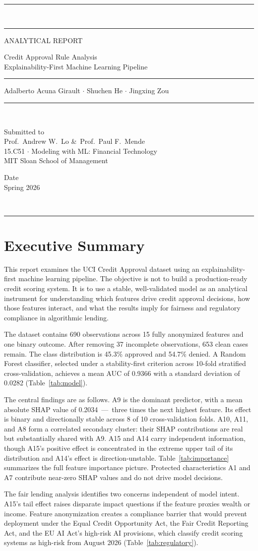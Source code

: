 \documentclass[11pt]{article}
\newcommand{\coverpage}{%
  \thispagestyle{empty}
  {\color{NavyReport}\rule{\linewidth}{6pt}}\\[2pt]
  {\color{AccentBlue}\rule{\linewidth}{1.5pt}}
  \vspace{2.4cm}

  {\fontfamily{phv}\fontseries{b}\fontsize{9}{11}\selectfont
   \color{AccentBlue}\MakeUppercase{Analytical Report}}

  \vspace{0.5cm}

  {\fontfamily{phv}\fontseries{b}\fontsize{26}{30}\selectfont
   \color{NavyReport} Credit Approval Rule Analysis}\\[0.5em]
  {\fontfamily{phv}\fontseries{m}\fontsize{14}{17}\selectfont
   \color{AccentBlue} Explainability-First Machine Learning Pipeline}

  \vspace{0.6cm}
  {\color{MidGray}\rule{\linewidth}{0.6pt}}
  \vspace{0.4cm}

  {\fontfamily{phv}\fontsize{10}{12}\selectfont
   \color{NavyReport}
   Adalberto Acuna Girault $\cdot$ Shuchen He $\cdot$ Jingxing Zou}

  \vfill

  {\color{MidGray}\rule{\linewidth}{0.6pt}}\\[8pt]
  \begin{minipage}[t]{0.55\linewidth}
    {\fontfamily{phv}\fontseries{b}\fontsize{9}{11}\selectfont\color{NavyReport}
     Submitted to}\\[3pt]
    {\fontfamily{phv}\fontsize{9}{12}\selectfont\color{NavyReport}
     Prof.\ Andrew W.\ Lo \&\ Prof.\ Paul F.\ Mende\\[1pt]
     15.C51 $\cdot$ Modeling with ML: Financial Technology\\[1pt]
     MIT Sloan School of Management}
  \end{minipage}%
  \hfill
  \begin{minipage}[t]{0.35\linewidth}
    \raggedleft
    {\fontfamily{phv}\fontseries{b}\fontsize{9}{11}\selectfont\color{NavyReport}
     Date}\\[3pt]
    {\fontfamily{phv}\fontsize{9}{12}\selectfont\color{NavyReport} Spring 2026}
  \end{minipage}
  \\[6pt]
  {\color{NavyReport}\rule{\linewidth}{3pt}}
  \newpage
}
\begin{document}
\coverpage

{\hypersetup{linkcolor=NavyReport}
\tableofcontents}
\newpage

\section{Executive Summary}

This report examines the UCI Credit Approval dataset using an explainability-first machine learning pipeline. The objective is not to build a production-ready credit scoring system. It is to use a stable, well-validated model as an analytical instrument for understanding which features drive credit approval decisions, how those features interact, and what the results imply for fairness and regulatory compliance in algorithmic lending.

The dataset contains 690 observations across 15 fully anonymized features and one binary outcome. After removing 37 incomplete observations, 653 clean cases remain. The class distribution is 45.3\% approved and 54.7\% denied. A Random Forest classifier, selected under a stability-first criterion across 10-fold stratified cross-validation, achieves a mean AUC of 0.9366 with a standard deviation of 0.0282 (Table~\ref{tab:model}).

The central findings are as follows. A9 is the dominant predictor, with a mean absolute SHAP value of 0.2034~---~three times the next highest feature. Its effect is binary and directionally stable across 8 of 10 cross-validation folds. A10, A11, and A8 form a correlated secondary cluster: their SHAP contributions are real but substantially shared with A9. A15 and A14 carry independent information, though A15's positive effect is concentrated in the extreme upper tail of its distribution and A14's effect is direction-unstable. Table~\ref{tab:importance} summarizes the full feature importance picture. Protected characteristics A1 and A7 contribute near-zero SHAP values and do not drive model decisions.

The fair lending analysis identifies two concerns independent of model intent. A15's tail effect raises disparate impact questions if the feature proxies wealth or income. Feature anonymization creates a compliance barrier that would prevent deployment under the Equal Credit Opportunity Act, the Fair Credit Reporting Act, and the EU AI Act's high-risk AI provisions, which classify credit scoring systems as high-risk from August 2026 (Table~\ref{tab:regulatory}).
\end{document}
